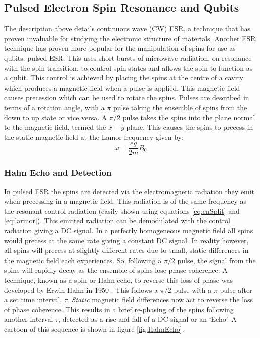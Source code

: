 \subsection{Pulsed Electron Spin Resonance and Qubits}
The description above details continuous wave (CW) ESR, a technique that has proven invaluable for studying the electronic structure of materials.
Another ESR technique has proven more popular for the manipulation of spins for use as qubits: pulsed ESR.
This uses short bursts of microwave radiation, on resonance with the spin transition, to control spin states and allows the spin to function as a qubit.
This control is achieved by placing the spins at the centre of a cavity which produces a magnetic field when a pulse is applied.
This magnetic field causes precession which can be used to rotate the spins. 
Pulses are described in terms of a rotation angle, with a $\pi$ pulse taking  the ensemble of spins from the down to up state or vice versa. 
A $\pi/2$ pulse takes the spins into the plane normal to the magnetic field, termed the $x-y$ plane. 
This causes the spins to precess in the static magnetic field at the Lamor frequency given by:
\begin{equation}
\label{eq:larmor}
\omega = \frac{eg}{2m}B_0
\end{equation}

\subsubsection{Hahn Echo and Detection}

In pulsed ESR the spins are detected via the electromagnetic radiation they emit when precessing in a magnetic field. 
This radiation is of the same frequency as the resonant control radiation (easily shown using equations \ref{eq:enSplit} and \ref{eq:larmor}).
This emitted radiation can be demodulated with the control radiation giving a DC signal.
In a perfectly homogeneous magnetic field all spins would precess at the same rate giving a constant DC signal. In reality however, all spins will precess at slightly different rates due to small, static differences in the magnetic field each experiences.
So, following a $\pi/2$ pulse, the signal from the spins will rapidly decay as the ensemble of spins lose phase coherence. 
A technique, known as a spin or Hahn echo, to reverse this loss of phase was developed by Erwin Hahn in 1950 \cite{hahn1950}. 
This follows a $\pi/2$ pulse with a $\pi$ pulse after a set time interval, $\tau$. 
\textit{Static} magnetic field differences now act to reverse the loss of phase coherence. 
This results in a brief re-phasing of the spins following another interval $\tau$, detected as a rise and fall of a DC signal or an `Echo'.
A cartoon of this sequence is shown in figure \ref{fig:HahnEcho}. 

